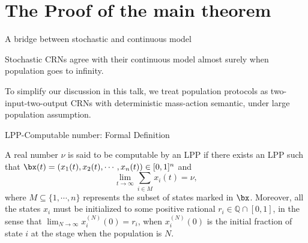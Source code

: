 \documentclass[aspectratio=169]{beamer}
\begin{document}
\section{The Proof of the main theorem}
\begin{frame}[Clean]{A bridge between stochastic and continuous model}
    \begin{kurtz}
        Stochastic CRNs agree with their continuous model almost surely when population goes to infinity.
    \end{kurtz}

To simplify our discussion in this talk, we treat population protocols as two-input-two-output CRNs with deterministic mass-action semantic, under large population assumption.
\end{frame}
\begin{frame}{LPP-Computable number: Formal Definition}
\begin{definition}
    A real number $\nu$ is said to be computable by an LPP if there exists an LPP such that $\bx(t)=(x_1(t),x_2(t),\cdots,x_n(t))\in [0,1]^n$ and
    \[
        \lim_{t\to \infty}\sum_{i\in M}x_i(t)=\nu,
    \]where $M\subseteq\{1,\cdots, n\}$ represents the subset of states marked in $\bx$. Moreover, all the states $x_i$ must be initialized to some positive rational $r_i\in \mathbb{Q}\cap[0,1]$, in the sense that $\lim_{N\to \infty} x_i^{(N)}(0)=r_i$, when $x_i^{(N)}(0)$ is the initial fraction of state $i$ at the stage when the population is $N$.
\end{definition}
\end{frame}
\end{document}
